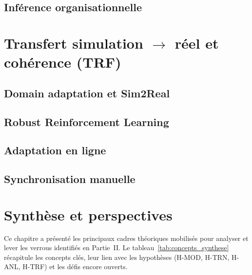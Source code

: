 \subsection{Inférence organisationnelle}

\section{Transfert simulation $\rightarrow$ réel et cohérence (TRF)}

\subsection{Domain adaptation et Sim2Real}

\subsection{Robust Reinforcement Learning}

\subsection{Adaptation en ligne}

\subsection{Synchronisation manuelle}

\section*{Synthèse et perspectives}
\noindent
Ce chapitre a présenté les principaux cadres théoriques mobilisés
pour analyser et lever les verrous identifiés en Partie~II.
Le tableau~\ref{tab:concepts_synthese} récapitule les concepts clés,
leur lien avec les hypothèses (H-MOD, H-TRN, H-ANL, H-TRF) et
les défis encore ouverts.

